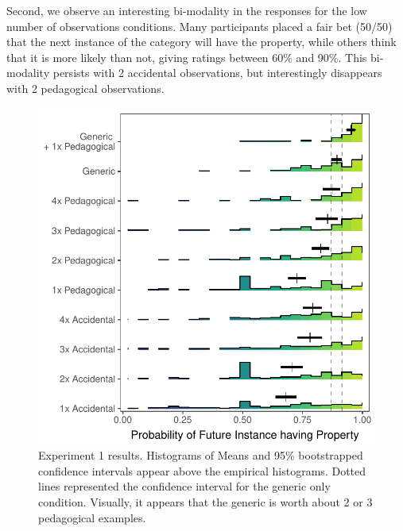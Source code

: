 \documentclass[10pt,letterpaper]{article}
\newcommand{\mht}[1]{\textcolor{Blue}{[mht: #1]}}
\begin{document}
Second, we observe an interesting bi-modality in the responses for the low number of observations conditions. 
Many participants placed a fair bet (50/50) that the next instance of the category will have the property, while others think that it is more likely than not, giving ratings between 60\% and 90\%. 
This bi-modality persists with 2 accidental observations, but interestingly disappears with 2 pedagogical observations. 




\begin{figure}[t]
\begin{center}
\includegraphics[width=\linewidth]{figs/genex-pilots_10conditions_reordered.pdf}
\end{center}
\caption{Experiment 1 results. Histograms of  Means and 95\% bootstrapped confidence intervals appear above the empirical histograms. Dotted lines represented the confidence interval for the generic only condition. Visually, it appears that the generic is worth about 2 or 3 pedagogical examples.}
\label{fig:results}
\end{figure}
\end{document}
